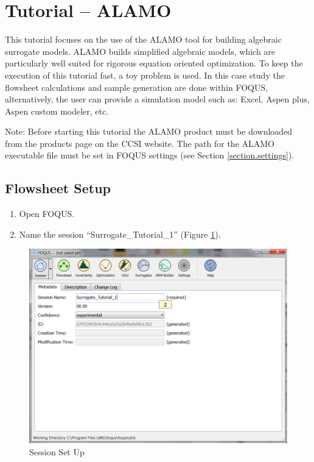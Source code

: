 \section{Tutorial -- ALAMO}
\label{sec.surrogate.alamo}
This tutorial focuses on the use of the ALAMO tool for building algebraic surrogate models. ALAMO builds simplified algebraic models, which are particularly well suited for rigorous equation oriented optimization. To keep the execution of this tutorial fast, a toy problem is used. In this case study the flowsheet calculations and sample generation are done within FOQUS, alternatively, the user can provide a simulation model such as: Excel, Aspen plus, Aspen custom modeler, etc. 

Note: Before starting this tutorial the ALAMO product must be downloaded from the products page on the CCSI website. The path for the ALAMO executable file must be set in FOQUS settings (see Section \ref{section.settings}).

\subsection{Flowsheet Setup}

\begin{enumerate}
	\item Open FOQUS.
	\item Name the session ``Surrogate\_Tutorial\_1'' (Figure \ref{fig.tut.sur.session}).
\end{enumerate}

\begin{figure}[H]
	\begin{center}
		\includegraphics[scale=0.55]{Chapt_surrogates/figs/session1}
		\caption{Session Set Up}
		\label{fig.tut.sur.session}
	\end{center}
\end{figure}

